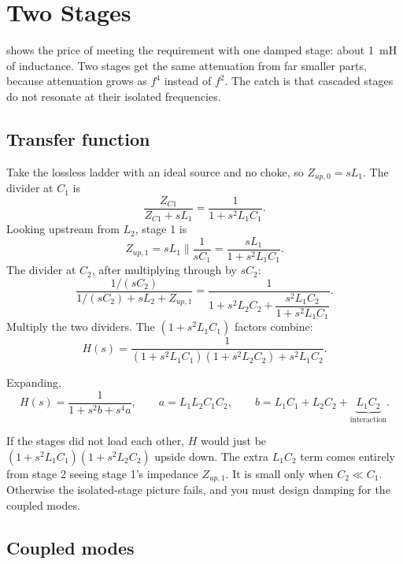\chapter{Two Stages}
\label{ch:two-stage}

 shows the price of meeting the requirement with
one damped stage: about \qty{1}{\milli\henry} of inductance. Two stages get the
same attenuation from far smaller parts, because attenuation grows as $f^4$
instead of $f^2$. The catch is that cascaded stages do not resonate at their
isolated frequencies.

\section{Transfer function}

\begin{derivation}
	Take the lossless ladder with an ideal source and no choke, so
	$Z_{up,0} = sL_1$. The divider at $C_1$ is
	\[
		\frac{Z_{C1}}{Z_{C1} + sL_1} = \frac{1}{1 + s^2 L_1C_1}.
	\]
	Looking upstream from $L_2$, stage 1 is
	\[
		Z_{up,1} = sL_1 \parallel \frac{1}{sC_1} = \frac{sL_1}{1 + s^2L_1C_1}.
	\]
	The divider at $C_2$, after multiplying through by $sC_2$:
	\[
		\frac{1/(sC_2)}{1/(sC_2) + sL_2 + Z_{up,1}}
		= \frac{1}{1 + s^2L_2C_2 + \dfrac{s^2L_1C_2}{1 + s^2L_1C_1}}.
	\]
	Multiply the two dividers. The $(1 + s^2L_1C_1)$ factors combine:
	\[
		H(s) = \frac{1}{(1 + s^2L_1C_1)(1 + s^2L_2C_2) + s^2L_1C_2}.
	\]
\end{derivation}

Expanding,
\begin{equation}\label{eq:H-two-stage}
	H(s) = \frac{1}{1 + s^2 b + s^4 a}, \qquad
	a = L_1L_2C_1C_2, \qquad
	b = L_1C_1 + L_2C_2 + \underbrace{L_1C_2}_{\text{interaction}}.
\end{equation}

\begin{idea}
	If the stages did not load each other, $H$ would just be
	$(1 + s^2L_1C_1)(1 + s^2L_2C_2)$ upside down. The extra $L_1C_2$ term comes
	entirely from stage 2 seeing stage 1's impedance $Z_{up,1}$. It is small only
	when $C_2 \ll C_1$. Otherwise the isolated-stage picture fails, and you must
	design damping for the coupled modes.
\end{idea}

\section{Coupled modes}

